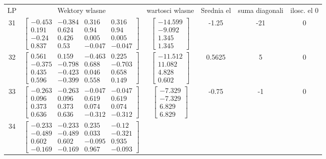 \documentclass[a4paper,12pt]{article}
\begin{document}
\bgroup {} \vspace{0.2in} \begin{tabular}{c c c c c c}
LP &Wektory wlasne & wartosci wlasne & Srednia el & suma diagonali & ilosc. el 0\\
31
&
$\begin{bmatrix} -0.453 & -0.384 & 0.316 & 0.316 \\ 0.191 & 0.624 & 0.94 & 0.94 \\ -0.24 & 0.426 & 0.005 & 0.005 \\ 0.837 & 0.53 & -0.047 & -0.047 \end{bmatrix}$
&
$\begin{bmatrix} -14.599 \\ -9.092 \\ 1.345 \\ 1.345 \end{bmatrix}$
&
-1.25
&
-21
&
0
\\
32
&
$\begin{bmatrix} 0.561 & 0.159 & -0.463 & 0.225 \\ -0.375 & -0.798 & 0.688 & -0.703 \\ 0.435 & -0.423 & 0.046 & 0.658 \\ 0.596 & -0.399 & 0.558 & 0.149 \end{bmatrix}$
&
$\begin{bmatrix} -11.512 \\ 11.082 \\ 4.828 \\ 0.602 \end{bmatrix}$
&
0.5625
&
5
&
0
\\
33
&
$\begin{bmatrix} -0.263 & -0.263 & -0.047 & -0.047 \\ 0.096 & 0.096 & 0.619 & 0.619 \\ 0.373 & 0.373 & 0.074 & 0.074 \\ 0.636 & 0.636 & -0.312 & -0.312 \end{bmatrix}$
&
$\begin{bmatrix} -7.329 \\ -7.329 \\ 6.829 \\ 6.829 \end{bmatrix}$
&
-0.75
&
-1
&
0
\\
34
&
$\begin{bmatrix} -0.233 & -0.233 & 0.235 & -0.12 \\ -0.489 & -0.489 & 0.033 & -0.321 \\ 0.602 & 0.602 & -0.095 & 0.935 \\ -0.169 & -0.169 & 0.967 & -0.093 \end{bmatrix}$

\end{tabular}
\end{document}
